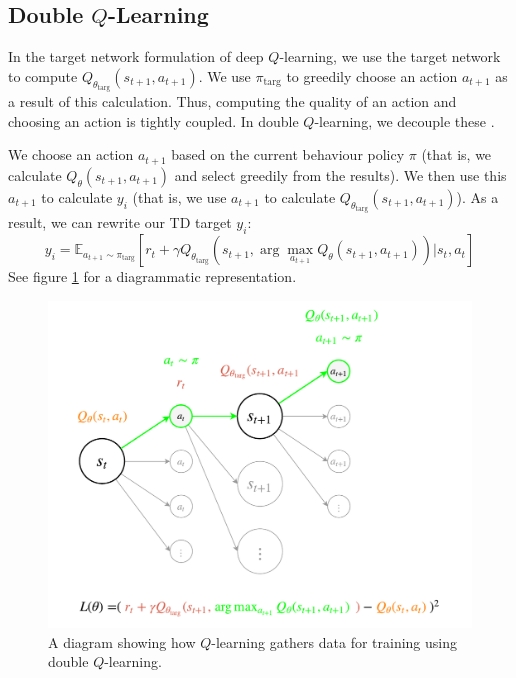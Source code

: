 \documentclass[journal, onecolumn, 12pt, draftclsnofoot]{IEEEtran}
\begin{document}
		\subsection{Double $Q$-Learning}
		\par In the target network formulation of deep $Q$-learning, we use the target network to compute $Q_{\theta_\text{targ}}(s_{t+1}, a_{t+1})$. We use $\pi_\text{targ}$ to greedily choose an action $a_{t+1}$ as a result of this calculation. Thus, computing the quality of an action and choosing an action is tightly coupled. In double $Q$-learning, we decouple these \cite{ddqn}.
		\par We choose an action $a_{t+1}$ based on the current behaviour policy $\pi$ (that is, we calculate $Q_\theta(s_{t+1},a_{t+1})$ and select greedily from the results). We then use this $a_{t+1}$ to calculate $y_i$ (that is, we use $a_{t+1}$ to calculate $Q_{\theta_\text{targ}}(s_{t+1}, a_{t+1})$). As a result, we can rewrite our TD target $y_i$:
		\begin{equation}
			\label{eqn:y_i_double}
		y_i = \mathbb{E}_{a_{t+1} \sim \pi_\text{targ}} \left[ r_t + \gamma Q_{\theta_\text{targ}}(s_{t+1}, \arg \max_{a_{t+1}} Q_\theta (s_{t+1}, a_{t+1})) \big\vert s_t, a_t \right]
		\end{equation}
		See figure \ref{fig:state-transition-q-learning-loss-double} for a diagrammatic representation.
		\begin{figure}[ht]
			\begin{center}
			\includegraphics[scale=0.75]{fig/state-transition-q-learning-loss-double.pdf}
		\end{center}
			\caption{A diagram showing how $Q$-learning gathers data for training using double $Q$-learning.}
			\label{fig:state-transition-q-learning-loss-double}
		\end{figure}
\end{document}
